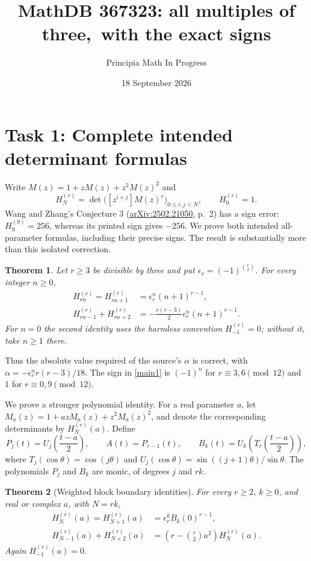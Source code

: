 \documentclass[10pt]{article}
\title{MathDB 367323: all multiples of three,\ with the exact signs}
\author{Principia Math In Progress}
\date{18 September 2026}
\newtheorem{theorem}{Theorem}
\begin{document}
\maketitle

\section*{Task 1: Complete intended determinant formulas}
Write $M(z)=1+zM(z)+z^2M(z)^2$ and
\[
 H_N^{(r)}=\det\bigl([z^{i+j}]M(z)^r\bigr)_{0\le i,j<N},\qquad H_0^{(r)}=1.
\]
Wang and Zhang's Conjecture 3
(\href{https://arxiv.org/abs/2502.21050}{arXiv:2502.21050}, p.~2)
has a sign error: $H_9^{(9)}=256$, whereas its printed sign gives
$-256$. We prove both intended all-parameter formulas, including
their precise signs. The result is substantially more than this
isolated correction.

\begin{theorem}\label{target}
Let $r\ge3$ be divisible by three and put
$\epsilon_r=(-1)^{\binom r2}$. For every integer $n\ge0$,
\begin{align}
 H_{rn}^{(r)}=H_{rn+1}^{(r)}&=\epsilon_r^n(n+1)^{r-1},\label{main1}\\
 H_{rn-1}^{(r)}+H_{rn+2}^{(r)}
 &=-\frac{r(r-3)}2\epsilon_r^n(n+1)^{r-1}.\label{main2}
\end{align}
For $n=0$ the second identity uses the harmless convention
$H_{-1}^{(r)}=0$; without it, take $n\ge1$ there.
\end{theorem}
Thus the absolute value required of the source's $\alpha$ is
correct, with $\alpha=-\epsilon_r^n r(r-3)/18$. The sign in
\eqref{main1} is $(-1)^n$ for $r\equiv3,6\pmod{12}$ and $1$
for $r\equiv0,9\pmod{12}$.

We prove a stronger polynomial identity. For a real parameter $a$,
let $M_a(z)=1+azM_a(z)+z^2M_a(z)^2$, and denote the corresponding
determinants by $H_N^{(r)}(a)$. Define
\[
 P_j(t)=U_j\!\left(\frac{t-a}{2}\right),\qquad
 A(t)=P_{r-1}(t),\qquad
 B_k(t)=U_k\!\left(T_r\!\left(\frac{t-a}{2}\right)\right),
\]
where $T_j(\cos\theta)=\cos(j\theta)$ and
$U_j(\cos\theta)=\sin((j+1)\theta)/\sin\theta$.
The polynomials $P_j$ and $B_k$ are monic, of degrees $j$ and $rk$.

\begin{theorem}[Weighted block boundary identities]\label{weighted}
For every $r\ge2$, $k\ge0$, and real or complex $a$, with $N=rk$,
\begin{align}
 H_N^{(r)}(a)=H_{N+1}^{(r)}(a)
 &=\epsilon_r^k B_k(0)^{r-1},\label{weighted1}\\
 H_{N-1}^{(r)}(a)+H_{N+2}^{(r)}(a)
 &=\left(r-\binom r2a^2\right)H_N^{(r)}(a).\label{weighted2}
\end{align}
Again $H_{-1}^{(r)}(a)=0$.
\end{theorem}
\end{document}
